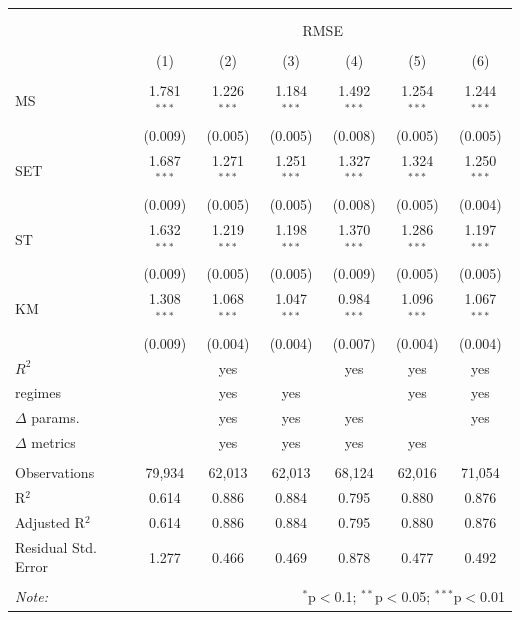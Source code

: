 \begin{tabular}{@{\extracolsep{5pt}}lcccccc} 
\\[-1.8ex]\hline 
\hline \\[-1.8ex] 
\\[-1.8ex] & \multicolumn{6}{c}{RMSE} \\ 
\\[-1.8ex] & (1) & (2) & (3) & (4) & (5) & (6)\\ 
\hline \\[-1.8ex] 
 MS & 1.781$^{***}$ & 1.226$^{***}$ & 1.184$^{***}$ & 1.492$^{***}$ & 1.254$^{***}$ & 1.244$^{***}$ \\ 
  & (0.009) & (0.005) & (0.005) & (0.008) & (0.005) & (0.005) \\ 
  SET & 1.687$^{***}$ & 1.271$^{***}$ & 1.251$^{***}$ & 1.327$^{***}$ & 1.324$^{***}$ & 1.250$^{***}$ \\ 
  & (0.009) & (0.005) & (0.005) & (0.008) & (0.005) & (0.004) \\ 
  ST & 1.632$^{***}$ & 1.219$^{***}$ & 1.198$^{***}$ & 1.370$^{***}$ & 1.286$^{***}$ & 1.197$^{***}$ \\ 
  & (0.009) & (0.005) & (0.005) & (0.009) & (0.005) & (0.005) \\ 
  KM & 1.308$^{***}$ & 1.068$^{***}$ & 1.047$^{***}$ & 0.984$^{***}$ & 1.096$^{***}$ & 1.067$^{***}$ \\ 
  & (0.009) & (0.004) & (0.004) & (0.007) & (0.004) & (0.004) \\ 
$R^2$ &  & yes &  & yes & yes & yes \\
  regimes &  & yes & yes &  & yes & yes \\
$\Delta$ params. &  & yes & yes & yes &  & yes \\
$\Delta$ metrics &  & yes & yes & yes & yes &  \\
 \hline \\[-1.8ex] 
Observations & 79,934 & 62,013 & 62,013 & 68,124 & 62,016 & 71,054 \\ 
R$^{2}$ & 0.614 & 0.886 & 0.884 & 0.795 & 0.880 & 0.876 \\ 
Adjusted R$^{2}$ & 0.614 & 0.886 & 0.884 & 0.795 & 0.880 & 0.876 \\ 
Residual Std. Error & 1.277 & 0.466 & 0.469 & 0.878 & 0.477 & 0.492 \\ 
\hline 
\hline \\[-1.8ex] 
\textit{Note:}  & \multicolumn{6}{r}{$^{*}$p$<$0.1; $^{**}$p$<$0.05; $^{***}$p$<$0.01} \\ 
\end{tabular} 
